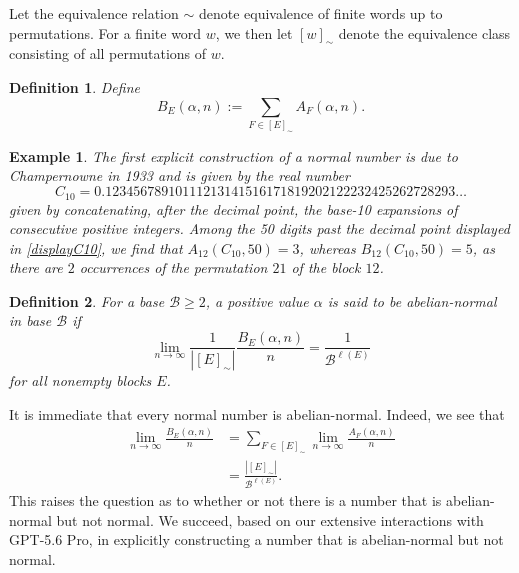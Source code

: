 \documentclass[12pt]{article}
\newtheorem{definition}{Definition}
\newtheorem{example}{Example}
\begin{document}
 Let the equivalence relation $\sim$ denote equivalence 
 of finite words up to permutations. For a finite word $w$, 
 we then let $[w]_{\sim}$ denote the equivalence
 class consisting of all permutations of $w$. 

\begin{definition}\label{definitionBcount}
 Define
 $$ B_{E}(\alpha, n) := \sum_{F \in [E]_{\sim}} A_{F}(\alpha, n). $$
 \end{definition}

\begin{example}
 The first explicit construction of a normal number is due to Champernowne in 1933 \cite{Champernowne1933} and is given by the
 real number
\begin{equation}\label{displayC10}
 C_{10} = 0.12345678910111213141516171819202122232425262728293\ldots 
\end{equation}
 given by concatenating, after the decimal point, the base-10 expansions of consecutive positive integers. 
 Among the 50 digits past the decimal point displayed in \eqref{displayC10}, 
 we find that 
 $A_{12}(C_{10}, 50) = 3$, whereas 
 $B_{12}(C_{10}, 50) = 5$, as there are $2$ occurrences of the permutation $21$ of the block $12$. 
\end{example}

\begin{definition}\label{abnormal}
 For a base $\mathcal{B} \geq 2$, 
 a positive value $\alpha$ is said to be \emph{abelian-normal} in base $\mathcal{B}$ if 
\begin{equation}\label{displayabnormal}
 \lim_{n \to \infty} \frac{1}{ \left| [E]_{\sim} \right| } \frac{B_{E}(\alpha, n)}{n} = \frac{1}{\mathcal{B}^{\ell(E)}} 
\end{equation}
 for all  nonempty   blocks $E$. 
\end{definition}

 It is immediate that every normal number is abelian-normal. Indeed, we see that 
\begin{align*}
 \lim_{n \to \infty} \frac{B_{E}(\alpha, n)}{n} 
 & = \sum_{F \in [E]_{\sim}} \lim_{n \to \infty} \frac{A_{F}(\alpha, n)}{n} \\ 
 & = \frac{ \left| [E]_{\sim} \right| }{\mathcal{B}^{\ell(E)}}. 
\end{align*}
 This raises the question 
 as to whether or not there is a number that is abelian-normal but not normal. 
 We succeed, based on our extensive interactions with GPT-5.6 Pro, 
 in explicitly constructing a 
 number that is abelian-normal but not normal. 
\end{document}
